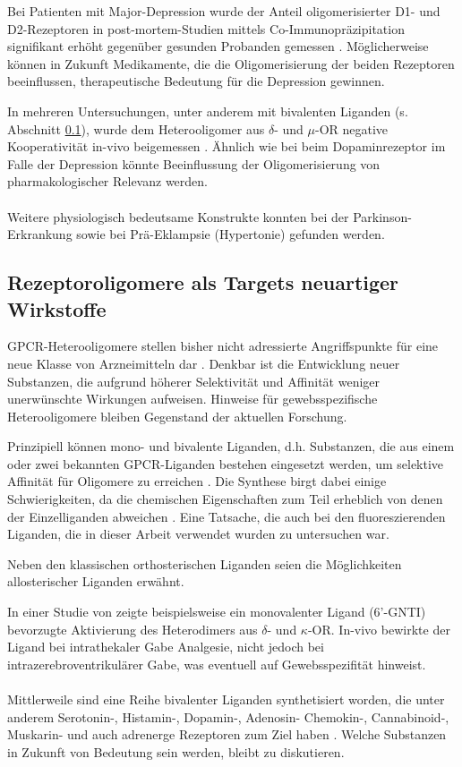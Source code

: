 Bei Patienten mit Major-Depression wurde der Anteil oligomerisierter D1- und D2-Rezeptoren in post-mortem-Studien mittels Co-Immunopräzipitation signifikant erhöht gegenüber gesunden Probanden gemessen \parencite{Pei2010}. Möglicherweise können in Zukunft Medikamente, die die Oligomerisierung der beiden Rezeptoren beeinflussen, therapeutische Bedeutung für die Depression gewinnen. 

In mehreren Untersuchungen, unter anderem mit bivalenten Liganden (s. Abschnitt \ref{drugs}), wurde dem Heterooligomer aus $\delta$- und $\mu$-OR negative Kooperativität in-vivo beigemessen \parencite{Daniels2005, Lenard2007, He2011}. Ähnlich wie bei beim Dopaminrezeptor im Falle der Depression könnte Beeinflussung der Oligomerisierung von pharmakologischer Relevanz werden.
\\ \\
Weitere physiologisch bedeutsame Konstrukte konnten bei der Parkinson-Erkrankung \parencite{Tanganelli2004, Fuxe2003, Fuxe2005} sowie bei Prä-Eklampsie (Hypertonie) \parencite{AbdAlla2001} gefunden werden.

\subsection{Rezeptoroligomere als Targets neuartiger Wirkstoffe}
\label{drugs}
GPCR-Heterooligomere stellen bisher nicht adressierte Angriffspunkte für eine neue Klasse von Arzneimitteln dar \parencite{George2002, Hiller2013, Ferre2014}. Denkbar ist die Entwicklung neuer Substanzen, die aufgrund höherer Selektivität und Affinität weniger unerwünschte Wirkungen aufweisen. Hinweise für gewebsspezifische Heterooligomere bleiben Gegenstand der aktuellen Forschung. 

Prinzipiell können mono- und bivalente Liganden, d.h. Substanzen, die aus einem oder zwei bekannten GPCR-Liganden bestehen eingesetzt werden, um selektive Affinität für Oligomere zu erreichen \parencite{Waldhoer2005, Burford2014}. Die Synthese birgt dabei einige Schwierigkeiten, da die chemischen Eigenschaften zum Teil erheblich von denen der Einzelliganden abweichen \parencite{Hiller2013}. Eine Tatsache, die auch bei den fluoreszierenden Liganden, die in dieser Arbeit verwendet wurden zu untersuchen war.

Neben den klassischen orthosterischen Liganden seien die Möglichkeiten allosterischer Liganden erwähnt. 

In einer Studie von \cite{Waldhoer2005} zeigte beispielsweise ein monovalenter Ligand (6'-GNTI) bevorzugte Aktivierung des Heterodimers aus $\delta$- und $\kappa$-OR. In-vivo bewirkte der Ligand bei intrathekaler Gabe Analgesie, nicht jedoch bei intrazerebroventrikulärer Gabe, was eventuell auf Gewebsspezifität hinweist.
\\ \\
Mittlerweile sind eine Reihe bivalenter Liganden synthetisiert worden, die unter anderem Serotonin-, Histamin-, Dopamin-, Adenosin- Chemokin-, Cannabinoid-, Muskarin- und auch adrenerge Rezeptoren zum Ziel haben \parencite{Hiller2013}. Welche Substanzen in Zukunft von Bedeutung sein werden, bleibt zu diskutieren.

